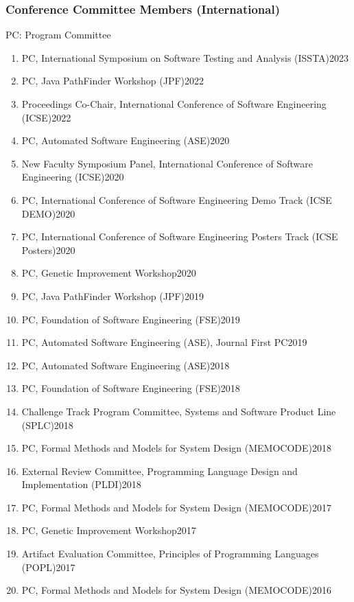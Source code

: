 \documentclass[11pt]{article}
\begin{document}
\subsubsection{Conference Committee Members (International)}

\begin{description}
\item PC: Program Committee
\end{description}

\begin{enumerate}
\item PC,  International Symposium on Software Testing and Analysis (ISSTA)\hfill 2023  
\item PC, Java PathFinder Workshop (JPF)\hfill 2022
\item Proceedings Co-Chair,  International Conference of Software Engineering (ICSE)\hfill 2022
\item PC, Automated Software Engineering (ASE)\hfill 2020
\item New Faculty Symposium Panel, International Conference of Software Engineering (ICSE)\hfill 2020
\item PC, International Conference of Software Engineering Demo Track (ICSE DEMO)\hfill 2020
\item PC, International Conference of Software Engineering Posters Track (ICSE Posters)\hfill 2020
\item PC, Genetic Improvement Workshop\hfill 2020
\item PC, Java PathFinder Workshop (JPF)\hfill 2019
\item PC, Foundation of Software Engineering (FSE)\hfill 2019
\item PC, Automated Software Engineering (ASE), Journal First PC\hfill 2019
\item PC, Automated Software Engineering (ASE)\hfill 2018
\item PC, Foundation of Software Engineering (FSE)\hfill 2018
\item Challenge Track Program Committee, Systems and Software Product Line (SPLC)\hfill 2018
\item PC, Formal Methods and Models for System Design (MEMOCODE)\hfill 2018
\item External Review Committee, Programming Language Design and Implementation (PLDI)\hfill 2018
\item PC, Formal Methods and Models for System Design (MEMOCODE)\hfill 2017
\item PC, Genetic Improvement Workshop\hfill 2017
\item Artifact Evaluation Committee, Principles of Programming Languages (POPL)\hfill 2017
\item PC, Formal Methods and Models for System Design (MEMOCODE)\hfill 2016
\end{enumerate}
\end{document}
